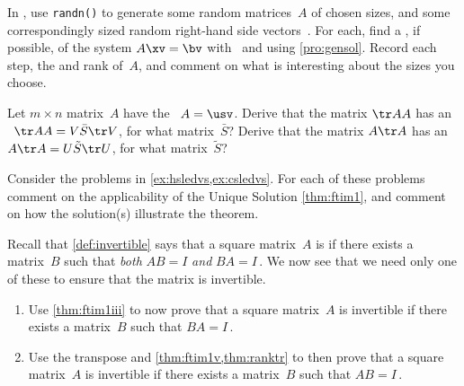 \begin{exercise}  
In \script, use \verb|randn()| to generate some random matrices~\(A\) of chosen sizes, and some correspondingly sized random right-hand side vectors~\bv.
For each, find a , if possible, of the system \(A\xv=\bv\) with \script\ and using \cref{pro:gensol}.
Record each step, the  and rank of~\(A\), and comment on what is interesting about the sizes you choose.
\end{exercise}


\begin{exercise} \label{ex:svdtrAA} 
Let \(m\times n\) matrix~\(A\) have the \svd\ \(A=\usv\).
Derive that the matrix \(\tr AA\) has an \svd\ \(\tr AA=V\bar S\tr V\), for what matrix~\(\bar S\)?
Derive that the matrix \(A\tr A\) has an \svd\ \(A\tr A=U\tilde S\tr U\), for what matrix~\(\tilde S\)?
\end{exercise}




\begin{exercise}  
Consider the problems in \cref{ex:hsledvs,ex:csledvs}.
For each of these problems comment on the applicability of the Unique Solution \cref{thm:ftim1}, and comment on how the solution(s) illustrate the theorem.
\end{exercise}



\begin{exercise}  
Recall that \cref{def:invertible} says that a square matrix~\(A\) is  if there exists a matrix~\(B\) such that \emph{both} \(AB=I\) \emph{and} \(BA=I\)\,.
We now see that we need only one of these to ensure that the matrix is invertible.
\begin{enumerate}
\item Use \cref{thm:ftim1iii} to now prove that a square matrix~\(A\) is invertible if there exists a matrix~\(B\) such that \(BA=I\)\,.

\item Use the transpose and \cref{thm:ftim1v,thm:ranktr} to then prove that a square matrix~\(A\) is invertible if there exists a matrix~\(B\) such that \(AB=I\)\,.
\end{enumerate}
\end{exercise}




